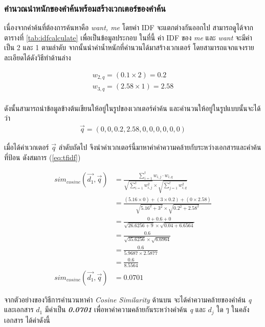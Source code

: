 \documentclass[11pt,a4paper]{article}
\begin{document}
{{{\subsubsection{คำนวณนำหนักของคำค้นพร้อมสร้างเวกเตอร์ของคำค้น}

เนื่องจากคำค้นที่ต้องการค้นหาคือ \emph{want, me} โดยค่า IDF จะแตกต่างกันออกไป สามารถดูได้จากตารางที่ \ref{tab:idfcalculate} เพื่อเป็นข้อมูลประกอบ ในที่นี้ ค่า IDF ของ \emph{me} และ \emph{want} จะมีค่าเป็น 2 และ 1 ตามลำดับ จากนั้นนำค่าน้ำหนักที่คำนวนได้มาสร้างเวกเตอร์ โดยสามารถแจกแจงรายละเอียดได้ดังวิธีทำด้านล่าง

\begin{align*}
   w_{2,q} = (0.1  \times 2) = 0.2 \\
   w_{3,q} = (2.58 \times 1) = 2.58 \\
\end{align*}

ดังนั้นสามารถนำข้อมูลข้างต้นเขียนให้อยู่ในรูปของเวกเตอร์คำค้น และคำนวนให้อยู่ในรูปแบบนั้นจะได้ว่า 
\begin{align*}
    \overrightarrow{q} = (0, 0, 0.2, 2.58, 0, 0, 0, 0, 0, 0)
\end{align*}

เมื่อได้ค่าเวกเตอร์ $\overrightarrow{q}$ ลำดับถัดไป จึงนำค่าเวกเตอร์นี้มาหาค่าค่าความคล้ายกับระหว่างเอกสารและคำค้นที่ป้อน ดังสมการ ({\ref{eq:tfidf}}) 

\begin{align*}
    sim_{cosine}(\overrightarrow{d_{1}}, \overrightarrow{q}) & = \frac{\sum_{i=1}^{t} w_{i,j} \cdot w_{i,q}}{\sqrt{\sum_{i=1}^{t} w_{i,j}^2} \times \sqrt{\sum_{j=1}^{t} w_{i,q}^2}} \\
    &= \frac{(5.16 \times 0) + (3 \times 0.2) + (0 \times 2.58)}{\sqrt{5.16^{2} + 3^2} \times \sqrt{0.2^2 + 2.58^2}} \\
    &= \frac{0 + 0.6 + 0}{\sqrt{26.6256 + 9} \times \sqrt{0.04 + 6.6564}} \\
    &= \frac{0.6}{\sqrt{35.6256} \times \sqrt{6.6964}} \\
    &= \frac{0.6}{5.9687 \times 2.5877} \\
    &= \frac{0.6}{8.5564} \\
    sim_{cosine}(\overrightarrow{d_{1}}, \overrightarrow{q}) &= 0.0701 
\end{align*}

จากตัวอย่างของวิธีการคำนวนหาค่า \emph{Cosine Similarity} ด้านบน จะได้ค่าความคล้ายของคำค้น \emph{q} 
และเอกสาร \emph{$d_{1}$} มีค่าเป็น {\bf \emph{0.0701}} เพื่อหาค่าความคล้ายกันระหว่างคำค้น \emph{q} และ \emph{$d_{j}$} ใด ๆ ในคลังเอกสาร ได้ค่าดังนี้

}}}
\end{document}
